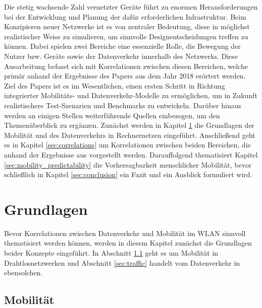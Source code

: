\documentclass[12pt, a4paper]{article}
\begin{document}
Die stetig wachsende Zahl vernetzter Geräte führt zu enormen Herausforderungen bei der Entwicklung
und Planung der dafür erforderlichen Infrastruktur. Beim Konzipieren neuer Netzwerke ist es von zentraler
Bedeutung, diese in möglichst realistischer Weise zu simulieren, um sinnvolle Designentscheidungen
treffen zu können. Dabei spielen zwei Bereiche eine essenzielle Rolle, die Bewegung der Nutzer bzw. Geräte
sowie der Datenverkehr innerhalb des Netzwerks.
Diese Ausarbeitung befasst sich mit Korrelationen zwischen diesen Bereichen,
welche primär anhand der Ergebnisse des Papers  \cite{Alipour2018} aus dem Jahr 2018 erörtert werden.
Ziel des Papers ist es im Wesentlichen, einen ersten Schritt in Richtung integrierter Mobilitäts- und Datenverkehr-Modelle 
zu ermöglichen, um in Zukunft realistischere Test-Szenarien und Benchmarks zu entwickeln.
Darüber hinaus werden an einigen Stellen weiterführende Quellen einbezogen, um den Themenüberblick zu ergänzen.\newline
Zunächst werden in Kapitel \ref{sec:basics} die Grundlagen der Mobilität und des Datenverkehrs in Rechnernetzen
eingeführt. Anschließend geht es in Kapitel \ref{sec:correlations} um Korrelationen zwischen beiden
Bereichen, die anhand der Ergebnisse aus \cite{Alipour2018} vorgestellt werden.
Darauffolgend thematisiert Kapitel \ref{sec:mobility_predictability} die Vorhersagbarkeit menschlicher Mobilität,
bevor schließlich in Kapitel \ref{sec:conclusion} ein Fazit und ein Ausblick formuliert wird.

\section{Grundlagen}
\label{sec:basics}

Bevor Korrelationen zwischen Datenverkehr und Mobilität im WLAN sinnvoll thematisiert werden können, 
werden in diesem Kapitel zunächst die Grundlagen beider Konzepte eingeführt.
In Abschnitt \ref{sec:mobility} geht es um Mobilität in Drahtlosnetzwerken und Abschnitt \ref{sec:traffic} handelt
vom Datenverkehr in ebensolchen.

\subsection{Mobilität}
\label{sec:mobility}
\end{document}
